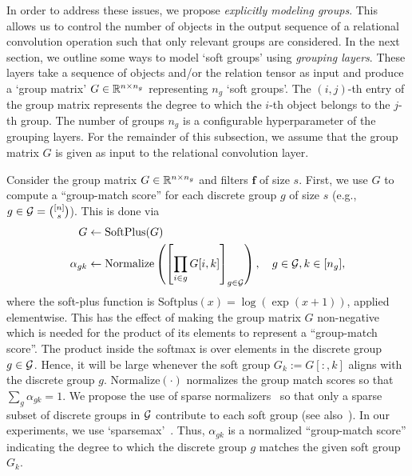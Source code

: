 In order to address these issues, we propose \textit{explicitly modeling groups}. This allows us to control the number of objects in the output sequence of a relational convolution operation such that only relevant groups are considered. In the next section, we outline some ways to model `soft groups' using \textit{grouping layers}. These layers take a sequence of objects and/or the relation tensor as input and produce a `group matrix' $G \in \mathbb{R}^{n \times n_g}$ representing $n_g$ `soft groups'. The $(i,j)$-th entry of the group matrix represents the degree to which the $i$-th object belongs to the $j$-th group. The number of groups $n_g$ is a configurable hyperparameter of the grouping layers. For the remainder of this subsection, we assume that the group matrix $G$ is given as input to the relational convolution layer.

Consider the group matrix $G \in \mathbb{R}^{n \times n_g}$ and filters $\bm{f}$ of size $s$. First, we use $G$ to compute a ``group-match score'' for each discrete group $g$ of size $s$ (e.g., $g \in {\mathcal{G}} = \binom{[n]}{s}$). This is done via
\begin{equation}\label{eq:group_match_score}
    \begin{split}
        G &\gets \text{SoftPlus}(G)\\
        \alpha_{gk} &\gets \text{Normalize}\left(\left[\prod_{i \in g} G[i,k]\right]_{g \in {\mathcal{G}}}\right), \quad g \in {\mathcal{G}}, k \in [n_g],
    \end{split}
\end{equation}
where the soft-plus function is $\text{Softplus}(x) = \log(\exp(x + 1))$, applied elementwise. This has the effect of making the group matrix $G$ non-negative which is needed for the product of its elements to represent a ``group-match score''. The product inside the softmax is over elements in the discrete group $g \in {\mathcal{G}}$. Hence, it will be large whenever the soft group $G_k := G[:, k]$ aligns with the discrete group $g$. $\mathrm{Normalize}(\cdot)$ normalizes the group match scores so that $\sum_{g} \alpha_{gk} = 1$. We propose the use of sparse normalizers~\citep{lahaControllableSparseAlternatives2018a} so that only a sparse subset of discrete groups in ${\mathcal{G}}$ contribute to each soft group (see also~). In our experiments, we use `sparsemax'~\citep{martinsSoftmaxSparsemaxSparse2016}. Thus, $\alpha_{gk}$ is a normalized ``group-match score'' indicating the degree to which the discrete group $g$ matches the given soft group $G_k$.

